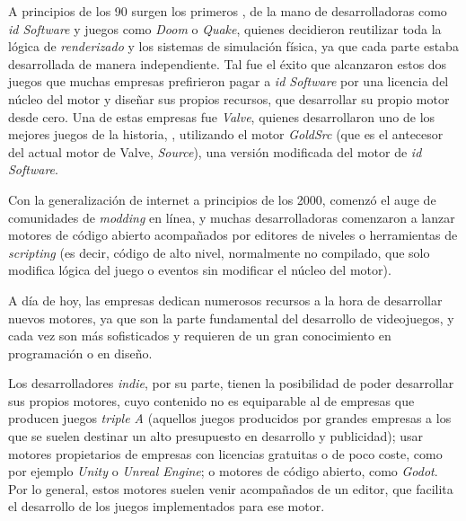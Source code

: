 \smallskip

A principios de los 90 surgen los primeros , de la mano de desarrolladoras como \textit{id Software} y juegos como \textit{Doom} o \textit{Quake}, quienes decidieron reutilizar toda la lógica de \textit{renderizado} y los sistemas de simulación física, ya que cada parte estaba desarrollada de manera independiente. Tal fue el éxito que alcanzaron estos dos juegos que muchas empresas prefirieron pagar a \textit{id Software} por una licencia del núcleo del motor y diseñar sus propios recursos, que desarrollar su propio motor desde cero. Una de estas empresas fue \textit{Valve}, quienes desarrollaron uno de los mejores juegos de la historia, , utilizando el motor \textit{GoldSrc} (que es el antecesor del actual motor de Valve, \textit{Source}), una versión modificada del motor de \textit{id Software}.

\medskip

Con la generalización de internet a principios de los 2000, comenzó el auge de comunidades de \textit{modding} en línea, y muchas desarrolladoras comenzaron a lanzar motores de código abierto acompañados por editores de niveles o herramientas de \textit{scripting} (es decir, código de alto nivel, normalmente no compilado, que solo modifica lógica del juego o eventos sin modificar el núcleo del motor).

\smallskip

A día de hoy, las empresas dedican numerosos recursos a la hora de desarrollar nuevos motores, ya que son la parte fundamental del desarrollo de videojuegos, y cada vez son más sofisticados y requieren de un gran conocimiento en programación o en diseño.

\smallskip

Los desarrolladores \textit{indie}, por su parte, tienen la posibilidad de poder desarrollar sus propios motores, cuyo contenido no es equiparable al de empresas que producen juegos \textit{triple A} (aquellos juegos producidos por grandes empresas a los que se suelen destinar un alto presupuesto en desarrollo y publicidad); usar motores propietarios de empresas con licencias gratuitas o de poco coste, como por ejemplo \textit{Unity} o \textit{Unreal Engine}; o motores de código abierto, como \textit{Godot}. Por lo general, estos motores suelen venir acompañados de un editor, que facilita el desarrollo de los juegos implementados para ese motor.

